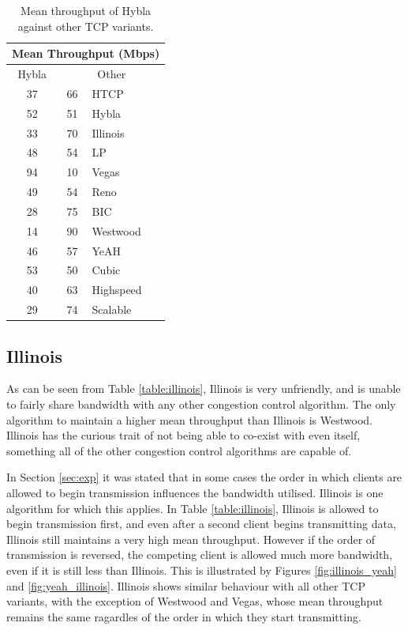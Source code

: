 \documentclass[11pt,a4paper,twocolumn]{article}
\begin{document}
\begin{table}[h!]
	\begin{center}
		\begin{tabular}{| c | c | l |}
    			\hline
			\multicolumn{3}{|c|}{Mean Throughput (Mbps)} \\
    			\hline
    			Hybla &  \multicolumn{2}{|c|}{Other}  \\
			\hline
    			37 & 66 & HTCP \\
			\hline
    			52 & 51 & Hybla \\
			\hline
    			33 & 70 & Illinois \\
			\hline
    			48 & 54 & LP \\
			\hline
    			94 & 10 & Vegas \\
			\hline
    			49 & 54 & Reno \\
			\hline
    			28 & 75 & BIC \\
			\hline
    			14 & 90 & Westwood \\
			\hline
    			46 & 57 & YeAH \\
			\hline
    			53 & 50 & Cubic \\
			\hline
    			40 & 63 & Highspeed \\
			\hline
    			29 & 74 & Scalable \\
    			\hline
    		\end{tabular}
  	\end{center}
  	\caption{Mean throughput of Hybla against other TCP variants.}
	\label{table:hybla}
\end{table}

\subsection{Illinois}
\label{subsec:illinois}
As can be seen from Table \ref{table:illinois}, Illinois is very unfriendly, and
is unable to fairly share bandwidth with any other congestion control algorithm. The only algorithm to maintain a higher mean throughput than Illinois is Westwood. Illinois has the curious trait
of not being able to co-exist with even itself, something all of the other congestion control algorithms are
capable of.

In Section \ref{sec:exp} it was stated that in some cases the order in which clients are allowed to begin transmission influences the bandwidth utilised. Illinois is one algorithm for which this applies. In Table
\ref{table:illinois}, Illinois is allowed to begin transmission first, and even after a second client begins
transmitting data, Illinois still maintains a very high mean throughput. However if the order of transmission
is reversed, the competing client is allowed much more bandwidth, even if it is still less than Illinois.
This is illustrated by Figures \ref{fig:illinois_yeah} and \ref{fig:yeah_illinois}. Illinois shows similar
behaviour with all other TCP variants, with the exception of Westwood and Vegas, whose mean
throughput remains the same ragardles of the order in which they start transmitting.
\end{document}
